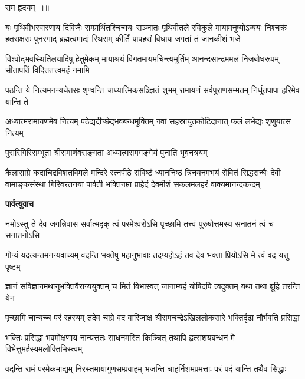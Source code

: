 



राम हृदयम् ॥॥

\fourlineindentedshloka
{यः पृथिवीभरवारणाय दिविजैः सम्प्रार्थितश्चिन्मयः}
{सञ्जातः पृथिवीतले रविकुले मायामनुष्योऽव्ययः}
{निश्चक्रं हतराक्षसः पुनरगाद् ब्रह्मत्वमाद्यं स्थिराम्}
{कीर्तिं पापहरां विधाय जगतां तं जानकीशं भजे} %

\fourlineindentedshloka
{विश्वोद्भवस्थितिलयादिषु हेतुमेकम्}
{मायाश्रयं विगतमायमचिन्त्यमूर्तिम्}
{आनन्दसान्द्रममलं निजबोधरूपम्}
{सीतापतिं विदिततत्त्वमहं नमामि} %

\fourlineindentedshloka
{पठन्ति ये नित्यमनन्यचेतसः}
{शृण्वन्ति चाध्यात्मिकसञ्ज्ञितं शुभम्}
{रामायणं सर्वपुराणसम्मतम्}
{निर्धूतपापा हरिमेव यान्ति ते} %

\fourlineindentedshloka
{अध्यात्मरामायणमेव नित्यम्}
{पठेद्यदीच्छेद्भवबन्धमुक्तिम्}
{गवां सहस्रायुतकोटिदानात्}
{फलं लभेद्यः शृणुयात्स नित्यम्} %

\twolineshloka
{पुरारिगिरिसम्भूता श्रीरामार्णवसङ्गता}
{अध्यात्मरामगङ्गेयं पुनाति भुवनत्रयम्} %

\fourlineindentedshloka
{कैलासाग्रे कदाचिद्रविशतविमले मन्दिरे रत्नपीठे}
{संविष्टं ध्याननिष्ठं त्रिनयनमभयं सेवितं सिद्धसन्घैः}
{देवी वामाङ्कसंस्था गिरिवरतनया पार्वती भक्तिनम्रा}
{प्राहेदं देवमीशं सकलमलहरं वाक्यमानन्दकन्दम्} %

\textbf{पार्वत्युवाच}

\fourlineindentedshloka
{नमोऽस्तु ते देव जगन्निवास}
{सर्वात्मदृक् त्वं परमेश्वरोऽसि}
{पृच्छामि तत्त्वं पुरुषोत्तमस्य}
{सनातनं त्वं च सनातनोऽसि} %

\fourlineindentedshloka
{गोप्यं यदत्यन्तमनन्यवाच्यम्}
{वदन्ति भक्तेषु महानुभावाः}
{तदप्यहोऽहं तव देव भक्ता}
{प्रियोऽसि मे त्वं वद यत्तु पृष्टम्} %

\fourlineindentedshloka
{ज्ञानं सविज्ञानमथानुभक्तिवैराग्ययुक्तम्}
{च मितं विभास्वत्}
{जानाम्यहं योषिदपि त्वदुक्तम्}
{यथा तथा ब्रूहि तरन्ति येन} %

\fourlineindentedshloka
{पृच्छामि चान्यच्च परं रहस्यम्}
{तदेव चाग्रे वद वारिजाक्ष}
{श्रीरामचन्द्रेऽखिललोकसारे}
{भक्तिर्दृढा नौर्भवति प्रसिद्धा} %

\fourlineindentedshloka
{भक्तिः प्रसिद्धा भवमोक्षणाय}
{नान्यत्ततः साधनमस्ति किञ्चित्}
{तथापि हृत्संशयबन्धनं मे}
{विभेत्तुमर्हस्यमलोक्तिभिस्त्वम्} %

\fourlineindentedshloka
{वदन्ति रामं परमेकमाद्यम्}
{निरस्तमायागुणसम्प्रवाहम्}
{भजन्ति चाहर्निशमप्रमत्ताः}
{परं पदं यान्ति तथैव सिद्धाः} %

